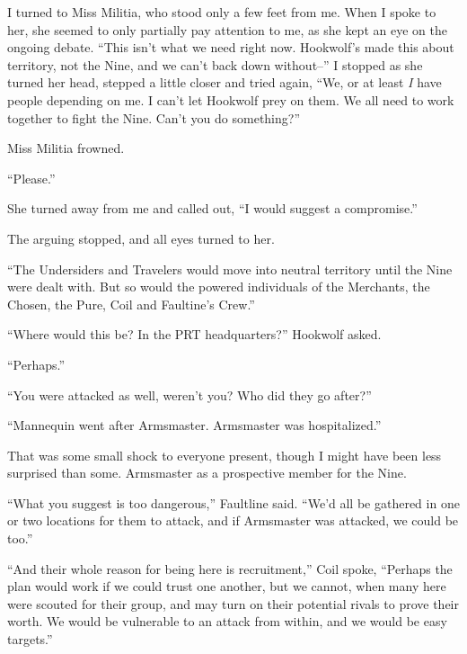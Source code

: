 I turned to Miss Militia, who stood only a few feet from me.  When I spoke to her, she seemed to only partially pay attention to me, as she kept an eye on the ongoing debate.  ``This isn't what we need right now.  Hookwolf's made this about territory, not the Nine, and we can't back down without--''  I stopped as she turned her head, stepped a little closer and tried again, ``We, or at least \emph{I} have people depending on me.  I can't let Hookwolf prey on them.  We all need to work together to fight the Nine.  Can't you do something?''



Miss Militia frowned.



``Please.''



She turned away from me and called out, ``I would suggest a compromise.''



The arguing stopped, and all eyes turned to her.



``The Undersiders and Travelers would move into neutral territory until the Nine were dealt with.  But so would the powered individuals of the Merchants, the Chosen, the Pure, Coil and Faultine's Crew.''



``Where would this be?  In the PRT headquarters?'' Hookwolf asked.



``Perhaps.''



``You were attacked as well, weren't you?  Who did they go after?''



``Mannequin went after Armsmaster.  Armsmaster was hospitalized.''



That was some small shock to everyone present, though I might have been less surprised than some.  Armsmaster as a prospective member for the Nine.



``What you suggest is too dangerous,'' Faultline said.  ``We'd all be gathered in one or two locations for them to attack, and if Armsmaster was attacked, we could be too.''



``And their whole reason for being here is recruitment,'' Coil spoke, ``Perhaps the plan would work if we could trust one another, but we cannot, when many here were scouted for their group, and may turn on their potential rivals to prove their worth.  We would be vulnerable to an attack from within, and we would be easy targets.''



